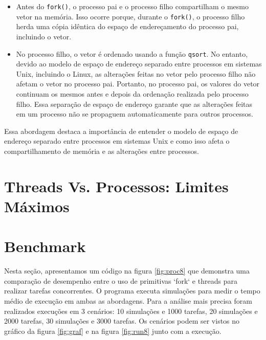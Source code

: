 \documentclass[
	12pt,				%
	openright,			%
	oneside,			%
	a4paper,			%
	chapter=TITLE,		%
	english,			%
	french,				%
	spanish,			%
	brazil				%
	]{abntex2}
\theoremstyle{definition}
\begin{document}
\begin{itemize}
    \item Antes do \texttt{fork()}, o processo pai e o processo filho compartilham o mesmo vetor na memória. Isso ocorre porque, durante o \texttt{fork()}, o processo filho herda uma cópia idêntica do espaço de endereçamento do processo pai, incluindo o vetor.

    \item No processo filho, o vetor é ordenado usando a função \texttt{qsort}. No entanto, devido ao modelo de espaço de endereço separado entre processos em sistemas Unix, incluindo o Linux, as alterações feitas no vetor pelo processo filho não afetam o vetor no processo pai. Portanto, no processo pai, os valores do vetor continuam os mesmos antes e depois da ordenação realizada pelo processo filho. Essa separação de espaço de endereço garante que as alterações feitas em um processo não se propaguem automaticamente para outros processos.

\end{itemize}

Essa abordagem destaca a importância de entender o modelo de espaço de endereço separado entre processos em sistemas Unix e como isso afeta o compartilhamento de memória e as alterações entre processos.


\section{Threads Vs. Processos: Limites Máximos}

\section{Benchmark}

Nesta seção, apresentamos um código na figura \ref{fig:proc8} que demonstra uma comparação 
de desempenho entre o uso de primitivas `fork` e threads para realizar tarefas 
concorrentes. O programa executa simulações para medir o tempo médio de 
execução em ambas as abordagens. Para a análise mais precisa foram realizados
execuções em 3 cenários: 10 simulações e 1000 tarefas, 20 simulações e 2000 tarefas,
30 simulações e 3000 tarefas. Os cenários podem ser vistos no gráfico da figura \ref{fig:graf}
e na figura \ref{fig:run8} junto com a execução.
\end{document}
